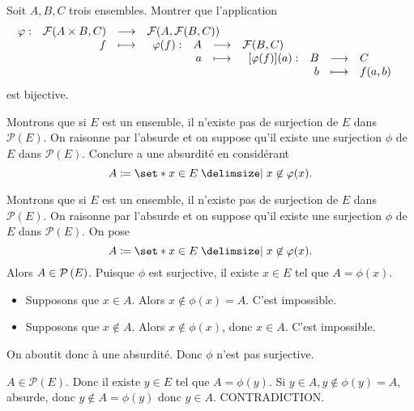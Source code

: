 \documentclass{magnolia}
\begin{document}
Soit $A,B,C$ trois ensembles. Montrer que l'application
\[\begin{array}[t]{lrcl} \displaystyle{\varphi} : & \displaystyle{\mathcal{F}(A\times B, C)} & \longrightarrow & \displaystyle{\mathcal{F}(A,\mathcal{F}(B, C))} \\ & \displaystyle{f} & \longmapsto & \displaystyle{
	\begin{array}[t]{lrcl} \displaystyle{\varphi(f)} : & \displaystyle{A} & \longrightarrow & \displaystyle{\mathcal{F}(B, C)} \\ & \displaystyle{a} & \longmapsto & \displaystyle{
		\begin{array}[t]{lrcl} \displaystyle{[\varphi(f)](a)} : & \displaystyle{B} & \longrightarrow & \displaystyle{C} \\ & \displaystyle{b} & \longmapsto & \displaystyle{f(a,b)} \end{array}
	} \end{array}} \end{array}\]
est bijective.

Montrons que si $E$ est un ensemble, il n'existe pas de surjection de $E$ dans $\mathcal{P}(E)$. On raisonne par l'absurde et on suppose qu'il existe une surjection $\phi$ de $E$ dans $\mathcal{P}(E)$.
Conclure a une absurdité en considérant
\[A\defeq\enstq{ x \in E}{x \not\in \phi(x)}.\]
\begin{sol}
Montrons que si $E$ est un ensemble, il n'existe pas de surjection de $E$ dans $\mathcal{P}(E)$. On raisonne par l'absurde et on suppose qu'il existe une surjection $\phi$ de $E$ dans $\mathcal{P}(E)$. On pose
\[A\defeq\enstq{ x \in E}{x \not\in \phi(x)}.\]
Alors $A\in\mathcal{P}\left(E\right)$. Puisque $\phi$ est surjective, il existe $x\in E$ tel que $A=\phi(x)$.
\begin{itemize}
\item Supposons que $x\in A$. Alors $x\not\in \phi(x)=A$. C'est impossible.
\item Supposons que $x\not\in A$. Alors $x\not\in\phi(x)$, donc $x\in A$. C'est impossible.
\end{itemize}
On aboutit donc à une absurdité. Donc $\phi$ n'est pas surjective.
\end{sol}

\begin{sol}
$A\in \mathcal{P}(E)$. Donc il existe $y\in E$ tel que $A=\phi(y)$. Si $y\in A, y\notin \phi(y)=A$, absurde, donc $y\notin A=\phi(y)$ donc $y\in A$. CONTRADICTION.
\end{sol}


\end{document}
